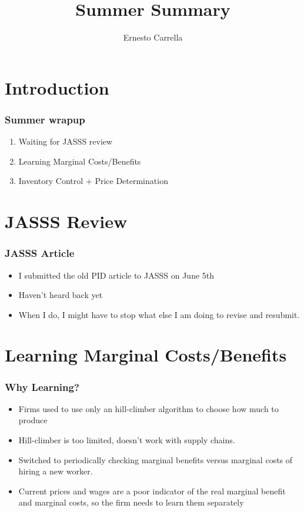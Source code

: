\documentclass[a4paper,12pt,english]{beamer}
\begin{document}
\title{Summer Summary}
\author{Ernesto Carrella}


\begin{frame}
\titlepage
\end{frame}

\section{Introduction}

\begin{frame}
	\frametitle{Summer wrapup}
	\begin{enumerate}
		\item  Waiting for JASSS review
		\pause
		\item Learning Marginal Costs/Benefits
		\pause
		\item Inventory Control + Price Determination				
	\end{enumerate}
	
\end{frame}


\section{JASSS Review}

\begin{frame}
\frametitle{JASSS Article}
\begin{itemize}
\item I submitted the old PID article to JASSS on June 5th
\pause
\item Haven't heard back yet
\pause
\item When I do, I might have to stop what else I am doing to revise and resubmit.
\end{itemize}
\end{frame}

\section{Learning Marginal Costs/Benefits}

\begin{frame}
\frametitle{Why Learning?}
\begin{itemize}
\item Firms used to use only an hill-climber algorithm to choose how much to produce
\pause
\item Hill-climber is too limited, doesn't work with supply chains.
\pause
\item Switched to periodically checking marginal benefits versus marginal costs of hiring a new worker.
\pause
\item Current prices and wages are a poor indicator of the real marginal benefit and marginal costs, so the firm needs to learn them separately
\end{itemize}
\end{frame}
\end{document}

